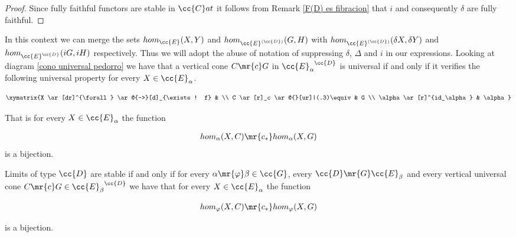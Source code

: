 \begin{proof}
Since fully faithful functors are stable in $\cc{C}at$  \cite[page 128]{sga1} it follows from Remark \ref{F(D) es fibracion}  that  $i$ and consequently $\delta$ are fully faithful. 
\end{proof}

\begin{remark}\label{caracterization of universal cones}
In this context we can merge the sets $hom_{\cc{E}}(X,Y)$ and ${hom_{\cc{E}^{(\cc{D})}}(G,H)}$ with $hom_{\cc{E}^{(\cc{D})}}(\delta X,\delta Y)$ and ${hom_{\cc{E}^{\cc{D}}}(iG,iH)}$ respectively. Thus we will  adopt the abuse of notation of suppressing $\delta$, $\Delta$ and $i$ in our expressions. Looking at diagram \ref{cono universal pedorro} we have that a vertical cone $C \mr{c} G$ in ${\cc{E}_\alpha}^{\cc{D}}$ is universal if and only if it verifies the following universal property for every $X \in \cc{E}_\alpha$. 

\[
\xymatrix{X \ar[dr]^{\forall} \ar@{-->}[d]_{\exists ! f} & \\
		  C \ar[r]_c \ar@{}[ur]|(.3)\equiv & G \\
		  \alpha \ar[r]^{id_\alpha} & \alpha}
\]

\noindent That is for every $X \in \cc{E}_\alpha$ the function 

\begin{align*}
hom_\alpha(X,C) \mr{c_*} hom_\alpha(X,G)
\end{align*}
\noindent is a bijection.
\end{remark}

\begin{proposition}\label{preservacion de limite intrinseca}
Limits of type $\cc{D}$ are stable  if and only if for every ${\alpha \mr{\varphi} \beta \in \cc{G}}$, every $\cc{D} \mr{G} \cc{E}_\beta$ and every vertical universal cone ${C \mr{c} G \in {\cc{E}_\beta}^{\cc{D}}}$ we have that for every $X \in \cc{E}_\alpha$ the function 

\[
hom_\varphi(X,C) \mr{c_*} hom_\varphi(X,G)
\]

\noindent is a bijection.
\end{proposition}


